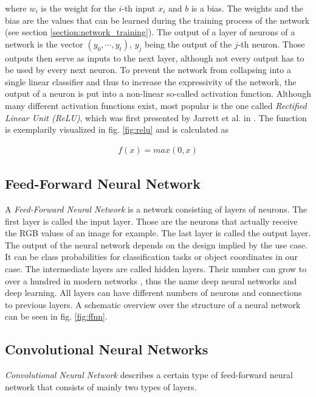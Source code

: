 where $w_i$ is the weight for the $i$-th input $x_i$ and $b$ is a bias. The weights and the bias are the values that can be learned during the training process of the network (see section \ref{section:network_training}). The output of a layer of neurons of a network is the vector $(y_0, \cdots, y_t)$, $y_j$ being the output of the $j$-th neuron. Those outputs then serve as inputs to the next layer, although not every output has to be used by every next neuron. To prevent the network from collapsing into a single linear classifier and thus to increase the expressivity of the network, the output of a neuron is put into a non-linear so-called activation function. Although many different activation functions exist, most popular is the one called \textit{Rectified Linear Unit (ReLU)}, which was first presented by Jarrett et al. in \cite{relu}. The function is exemplarily visualized in fig. \ref{fig:relu} and is calculated as

\begin{align}
f(x) = max(0, x)
\end{align} 

\subsection{Feed-Forward Neural Network}

A \textit{Feed-Forward Neural Network} is a network consisting of layers of neurons. The first layer is called the input layer. Those are the neurons that actually receive the RGB values of an image for example. The last layer is called the output layer. The output of the neural network depends on the design implied by the use case. It can be class probabilities for classification tasks or object coordinates in our case. The intermediate layers are called hidden layers. Their number can grow to over a hundred in modern networks \cite{resnet}, thus the name deep neural networks and deep learning. All layers can have different numbers of neurons and connections to previous layers. A schematic overview over the structure of a neural network can be seen in fig. \ref{fig:ffnn}. 

\subsection{Convolutional Neural Networks}

\textit{Convolutional Neural Network} describes a certain type of feed-forward neural network that consists of mainly two types of layers.

